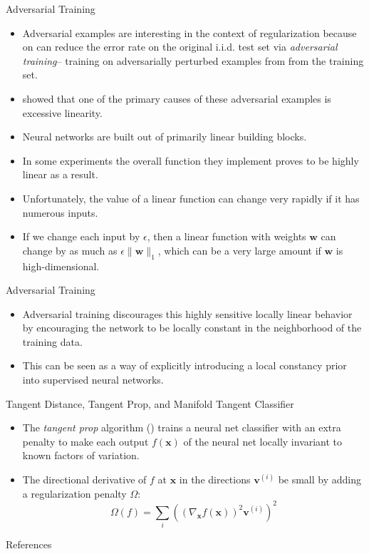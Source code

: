 \documentclass[10pt]{beamer}
\begin{document}
	\begin{frame}{Adversarial Training}
		\begin{itemize}
			\item Adversarial examples are interesting in the context of regularization because on can reduce the error rate on the original i.i.d. test set via \emph{adversarial training}-- training on adversarially perturbed examples from from the training set.
			\pause
			\item \citet{goodfellow2013multi} showed that one of the primary causes of these adversarial examples is excessive linearity.
			\pause
			\item Neural networks are built out of primarily linear building blocks.
			\pause
			\item In some experiments the overall function they implement proves to be highly linear as a result.
			\pause
			\item Unfortunately, the value of a linear function can change very rapidly if it has numerous inputs.
			\pause
			\item If we change each input by $\epsilon$, then a linear function with weights $\bm{w}$ can change by as much as $\epsilon\lVert\bm{w}\rVert_1$, which can be a very large amount if $\bm{w}$ is high-dimensional.
		\end{itemize}
	\end{frame}
	
	\begin{frame}{Adversarial Training}
		\begin{itemize}
			\item Adversarial training discourages this highly sensitive locally linear behavior by encouraging the network to be locally constant in the neighborhood of the training data.
			\pause
			\item This can be seen as a way of explicitly introducing a local constancy prior into supervised neural networks.
		\end{itemize}
	\end{frame}
	
	\begin{frame}{Tangent Distance, Tangent Prop, and Manifold Tangent Classifier}
		\begin{itemize}
			\item The \emph{tangent prop} algorithm (\citet{simard1991tangent}) trains a neural net classifier with an extra penalty to make each output $f(\bm{x})$ of the neural net locally invariant to known factors of variation.
			\pause
			\item The directional derivative of $f$ at $\bm{x}$ in the directions $\bm{v}^{(i)}$ be small by adding a regularization penalty $\Omega$:
			$$\Omega(f)=\sum_i\left(\left(\nabla_{\bm{x}}f(\bm{x})\right)^2\bm{v}^{(i)}\right)^2$$
		\end{itemize}
	\end{frame}
	
	\begin{frame}[allowframebreaks]{References}
		
		
	\end{frame}
\end{document}
